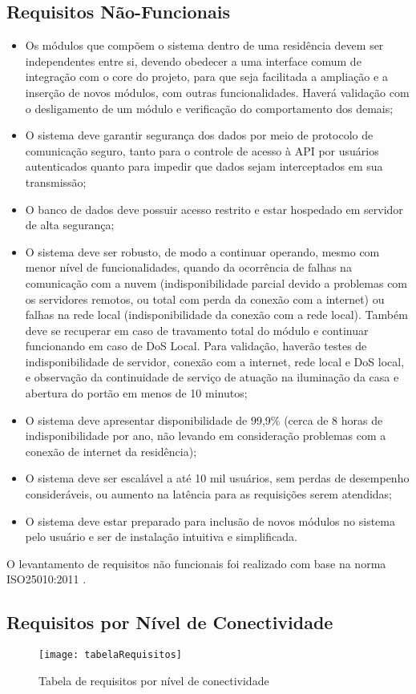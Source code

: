 \subsection{Requisitos Não-Funcionais}
\begin{itemize}
\item Os módulos que compõem o sistema dentro de uma residência devem ser independentes entre si, devendo obedecer a uma interface comum de integração com o core do projeto, para que seja facilitada a ampliação e a inserção de novos módulos, com outras funcionalidades. Haverá validação com o desligamento de um módulo e verificação do comportamento dos demais;
\item O sistema deve garantir segurança dos dados por meio de protocolo de comunicação seguro, tanto para o controle de acesso à API por usuários autenticados quanto para impedir que dados sejam interceptados em sua transmissão;
\item O banco de dados deve possuir acesso restrito e estar hospedado em servidor de alta segurança;
\item O sistema deve ser robusto, de modo a continuar operando, mesmo com menor nível de funcionalidades, quando da ocorrência de falhas na comunicação com a nuvem (indisponibilidade parcial devido a problemas com os servidores remotos, ou total com perda da conexão com a internet) ou falhas na rede local (indisponibilidade da conexão com a rede local). Também deve se recuperar em caso de travamento total do módulo e continuar funcionando em caso de DoS Local. Para validação, haverão testes de indisponibilidade de servidor, conexão com a internet, rede local e DoS local, e observação da continuidade de serviço de atuação na iluminação da casa e abertura do portão em menos de 10 minutos;
\item O sistema deve apresentar disponibilidade de 99,9\% (cerca de 8 horas de indisponibilidade por ano, não levando em consideração problemas com a conexão de internet da residência);
\item O sistema deve ser escalável a até 10 mil usuários, sem perdas de desempenho consideráveis, ou aumento na latência para as requisições serem atendidas;
\item O sistema deve estar preparado para inclusão de novos módulos no sistema pelo usuário e   ser de instalação intuitiva e simplificada.
\end{itemize}

O levantamento de requisitos não funcionais foi realizado com base na norma ISO25010:2011 \cite{iso25010}.

\subsection{Requisitos por Nível de Conectividade}

\begin{figure}[H]
	\centering
	\caption{Tabela de requisitos por nível de conectividade}
  \texttt{[image: tabelaRequisitos]}
\label{fig:tabelaRequisitos}
\end{figure}
